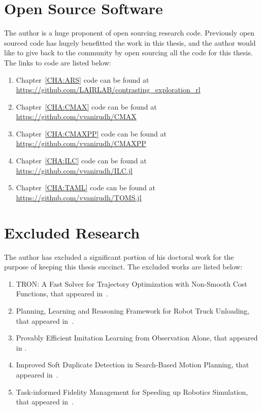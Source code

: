 \section{Open Source Software}
\label{sec:open-source-software}

The author is a huge proponent of open sourcing research
code. Previously open sourced code has hugely benefitted the work in
this thesis, and the author would like to give back to the community
by open sourcing all the code for this thesis. The links to code are
listed below:
\begin{enumerate}
\item Chapter~\ref{CHA:ARS} code can be found at
  \url{https://github.com/LAIRLAB/contrasting_exploration_rl}
\item Chapter~\ref{CHA:CMAX} code can be found at
  \url{https://github.com/vvanirudh/CMAX}
\item Chapter~\ref{CHA:CMAXPP} code can be found at
  \url{https://github.com/vvanirudh/CMAXPP}
\item Chapter~\ref{CHA:ILC} code can be found at
  \url{https://github.com/vvanirudh/ILC.jl}
\item Chapter~\ref{CHA:TAML} code can be found at
  \url{https://github.com/vvanirudh/TOMS.jl}
\end{enumerate}

\section{Excluded Research}
\label{sec:excluded-research}

The author has excluded a significant portion of his doctoral work for the
purpose of keeping this thesis succinct. The excluded works are listed below:
\begin{enumerate}
  \item TRON: A Fast Solver for Trajectory Optimization with Non-Smooth Cost
        Functions, that appeared in~\cite{tron}.
  \item Planning, Learning and Reasoning Framework for Robot Truck Unloading,
        that appeared in~\cite{truck}.
  \item Provably Efficient Imitation Learning from Observation Alone, that
        appeared in \cite{fail}.
  \item Improved Soft Duplicate Detection in Search-Based Motion Planning, that
        appeared in~\cite{duplicate}.
  \item Task-informed Fidelity Management for Speeding up Robotics Simulation,
        that appeared in~\cite{fidelity}.
\end{enumerate}


